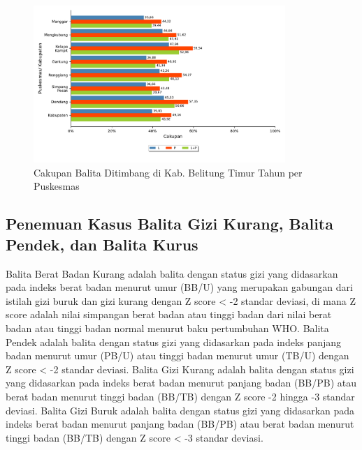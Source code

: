 \begin{figure}[H]
  \centering
  \includegraphics[width=0.85\textwidth]{bab_05/bab_05_24_balitaDitimbang}
  \caption{Cakupan Balita Ditimbang di Kab. Belitung Timur Tahun \tP per Puskesmas}
  \label{fig:Cakupan-Balita-Ditimbang}
\end{figure}


\subsection{Penemuan Kasus Balita Gizi Kurang, Balita Pendek, dan Balita Kurus}
\label{subsec:Penemuan-Kasus-Gizi-Kurang}
Balita Berat Badan Kurang adalah balita dengan status gizi yang didasarkan pada indeks berat badan menurut umur (BB/U) yang merupakan gabungan dari istilah gizi buruk dan gizi kurang dengan Z score < -2 standar deviasi, di mana Z score adalah nilai simpangan berat badan atau tinggi badan dari nilai berat badan atau tinggi badan normal menurut baku pertumbuhan WHO.
Balita Pendek adalah balita dengan status gizi yang didasarkan pada indeks panjang badan menurut umur (PB/U) atau tinggi badan menurut umur (TB/U) dengan Z score < -2 standar deviasi.
Balita Gizi Kurang adalah balita dengan status gizi yang didasarkan pada indeks berat badan menurut panjang badan (BB/PB) atau berat badan menurut tinggi badan (BB/TB) dengan Z score -2 hingga -3 standar deviasi.
Balita Gizi Buruk adalah balita dengan status gizi yang didasarkan pada indeks berat badan menurut panjang badan (BB/PB) atau berat badan menurut tinggi badan (BB/TB) dengan Z score < -3 standar deviasi.

